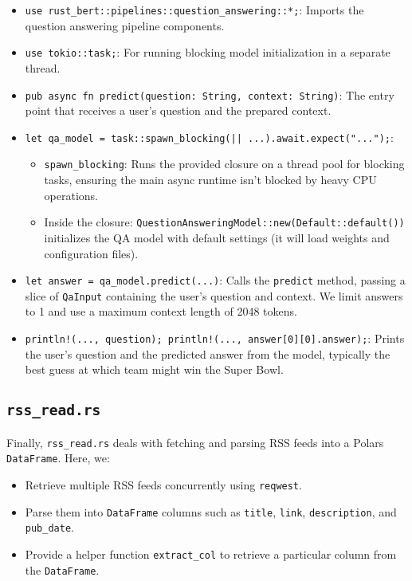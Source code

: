 \begin{itemize}
    \item \lstinline{use rust_bert::pipelines::question_answering::*;}: Imports the question answering pipeline components.
    \item \lstinline{use tokio::task;}: For running blocking model initialization in a separate thread.
    \item \lstinline{pub async fn predict(question: String, context: String)}: The entry point that receives a user’s question and the prepared context.
    \item \lstinline{let qa_model = task::spawn_blocking(|| ...).await.expect("...");}:
        \begin{itemize}
            \item \lstinline{spawn_blocking}: Runs the provided closure on a thread pool for blocking tasks, ensuring the main async runtime isn't blocked by heavy CPU operations.
            \item Inside the closure: \lstinline{QuestionAnsweringModel::new(Default::default())} initializes the QA model with default settings (it will load weights and configuration files).
        \end{itemize}
    \item \lstinline{let answer = qa_model.predict(...)}: Calls the \lstinline{predict} method, passing a slice of \lstinline{QaInput} containing the user’s question and context. We limit answers to 1 and use a maximum context length of 2048 tokens.
    \item \lstinline{println!(..., question); println!(..., answer[0][0].answer);}: Prints the user’s question and the predicted answer from the model, typically the best guess at which team might win the Super Bowl.
\end{itemize}

\subsection{\lstinline{rss_read.rs}}
Finally, \lstinline{rss_read.rs} deals with fetching and parsing RSS feeds into a Polars \lstinline{DataFrame}. Here, we:
\begin{itemize}
    \item Retrieve multiple RSS feeds concurrently using \lstinline{reqwest}.
    \item Parse them into \lstinline{DataFrame} columns such as \lstinline{title}, \lstinline{link}, \lstinline{description}, and \lstinline{pub_date}.
    \item Provide a helper function \lstinline{extract_col} to retrieve a particular column from the \lstinline{DataFrame}.
\end{itemize}

